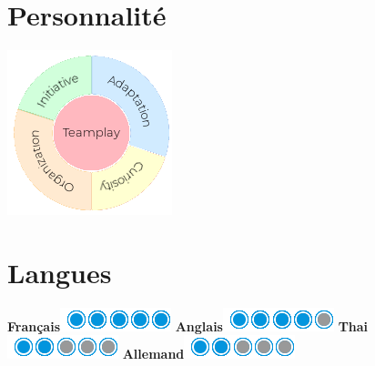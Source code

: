 \documentclass[]{friggeri-cv}
\begin{document}
\begin{aside}
  \section{Personnalité}
  \hspace{1cm}
    \includegraphics[scale=0.62]{img/personal.png}
    ~
  \section{Langues}
  \hspace{1cm}
    \textbf{Français}\includegraphics[scale=0.40]{img/5puces.png}
    \textbf{Anglais}\includegraphics[scale=0.40]{img/4puces.png}
    \textbf{Thai}\includegraphics[scale=0.40]{img/2puces.png}
    \textbf{Allemand}\includegraphics[scale=0.40]{img/2puces.png}
\end{aside}
\end{document}
